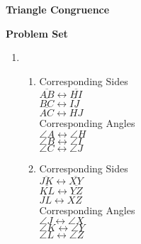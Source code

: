 \begin{center}
\textbf{Triangle Congruence}\\
\end{center}

\vspace*{1ex}

\textbf{Problem Set}

\vspce

\begin{enumerate}[label = \Alph*. ]
\item %

\begin{enumerate}[label = \arabic*. ]
\item %
Corresponding Sides \\
$\overline{AB} \leftrightarrow \overline{HI}  $ \redcheck \\
$\overline{BC} \leftrightarrow \overline{IJ}  $ \redcheck \\
$\overline{AC} \leftrightarrow \overline{HJ}  $ \redcheck \\
 
Corresponding Angles \\
$\angle{A} \leftrightarrow \angle{H}$ \redcheck \\
$\angle{B} \leftrightarrow \angle{I}$ \redcheck \\
$\angle{C} \leftrightarrow \angle{J}$ \redcheck \\

\item %
Corresponding Sides \\
$\overline{JK} \leftrightarrow \overline{XY}  $ \redcheck \\
$\overline{KL} \leftrightarrow \overline{YZ}  $ \redcheck \\
$\overline{JL} \leftrightarrow \overline{XZ}  $ \redcheck \\
 
Corresponding Angles \\
$\angle{J} \leftrightarrow \angle{X}$ \redcheck \\
$\angle{K} \leftrightarrow \angle{Y}$ \redcheck \\
$\angle{L} \leftrightarrow \angle{Z}$ \redcheck \\



\end{enumerate}
\end{enumerate}
